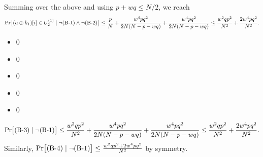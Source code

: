 Summing over the above and using $p+wq\leq N/2$, we reach
%
$${\Pr}\big[(a\oplus k_1)[i]\in U_2^{(1)}\mid\neg\text{(B-1)}\wedge\neg\text{(B-2)}\big]\leq
\frac{p}{N}+\frac{w^4pq^2}{2N(N-p-wq)}+
\frac{w^4pq^2}{2N(N-p-wq)}\leq\frac{w^2qp^2}{N^2}+\frac{2w^4pq^2}{N^2}.$$
%
\begin{itemize}
	\item 0
	\item 0
	\item 0
	\item 0
	\item 0
\end{itemize}
%
$${\Pr}\big[\text{(B-3)}\mid\neg\text{(B-1)}\big]\leq
\frac{w^2qp^2}{N^2}+\frac{w^4pq^2}{2N(N-p-wq)}+
\frac{w^4pq^2}{2N(N-p-wq)}\leq\frac{w^2qp^2}{N^2}+\frac{2w^4pq^2}{N^2}.$$
%
Similarly, ${\Pr}\big[\text{(B-4)}\mid\neg\text{(B-1)}\big] \leq
\frac{w^2qp^2+2w^4pq^2}{N^2}$ by symmetry.



%
%
%
%
%
%
%
%



